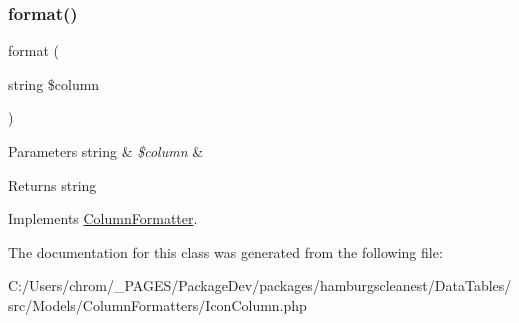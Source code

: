 \subsubsection{\texorpdfstring{format()}{format()}}
{\footnotesize\ttfamily format (\begin{DoxyParamCaption}\item[{string}]{\$column }\end{DoxyParamCaption})}


\begin{DoxyParams}[1]{Parameters}
string & {\em \$column} & \\
\hline
\end{DoxyParams}
\begin{DoxyReturn}{Returns}
string 
\end{DoxyReturn}


Implements \hyperlink{interfacehamburgscleanest_1_1_data_tables_1_1_interfaces_1_1_column_formatter_aba259f7ae8b25e70bd444020c04606e7}{Column\+Formatter}.



The documentation for this class was generated from the following file\+:\begin{DoxyCompactItemize}
\item 
C\+:/\+Users/chrom/\+\_\+\+P\+A\+G\+E\+S/\+Package\+Dev/packages/hamburgscleanest/\+Data\+Tables/src/\+Models/\+Column\+Formatters/Icon\+Column.\+php\end{DoxyCompactItemize}
